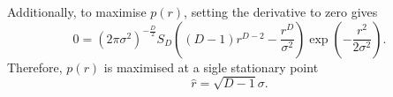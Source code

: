 Additionally, to maximise $p(r)$, setting the derivative to zero gives
%
\begin{equation}
0 = (2 \pi \sigma ^ 2) ^ {- \frac{D}{2}} S_D \left( (D - 1) r ^ {D - 2} - \frac{r ^ D}{\sigma ^ 2} \right) \exp \left( - \frac{r ^ 2}{2 \sigma ^2} \right).
\end{equation}
%
Therefore, $p(r)$ is maximised at a sigle stationary point
%
\begin{equation}
\hat{r} = \sqrt{D - 1} \sigma.
\end{equation}
%






















